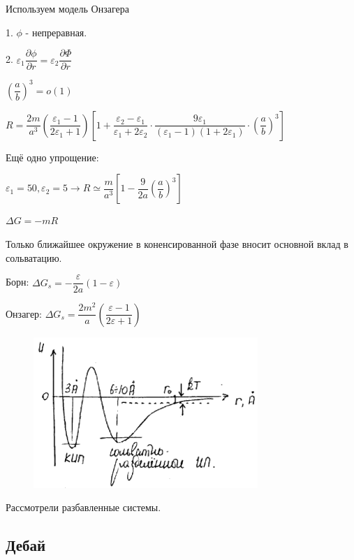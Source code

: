 \begin{lecture}
\begin{lecSection}
\par Используем модель Онзагера
\par 1. $\phi$ - непреравная.
\par 2. $\varepsilon_1 \dfrac{\partial \phi}{\partial r} = \varepsilon_2 \dfrac{\partial \Phi}{\partial r}$
\par $\left(\dfrac{a}{b}\right)^3 = o(1)$
\par $R = \dfrac{2m}{a^3} \left(\dfrac{\varepsilon_1-1}{2 \varepsilon_1 + 1}\right) \left[1 + \dfrac{\varepsilon_2 - \varepsilon_1}{\varepsilon_1 + 2 \varepsilon_2} \cdot \dfrac{9 \varepsilon_1}{(\varepsilon_1 - 1)(1 + 2 \varepsilon_1)} \cdot \left( \dfrac{a}{b}\right)^3 \right]$
\par Ещё одно упрощение:
\par $\varepsilon_1 = 50, \varepsilon_2 = 5 \rightarrow R \simeq \dfrac{m}{a^3} \left[1 - \dfrac{9}{2a} \left(\dfrac{a}{b}\right)^3\right]$
\par $\Delta G = -mR$
\par Только ближайшее окружение в коненсированной фазе вносит основной вклад в сольватацию.

\par Борн: $\Delta G_s = - \dfrac{\varepsilon}{2a}(1-\varepsilon)$
\par Онзагер: $\Delta G_s = \dfrac{2m^2}{a} \left(
\dfrac{\varepsilon - 1}{2 \varepsilon + 1}\right)$

	
\begin{figure}[H]
	
	\centering\includegraphics[width=0.6\linewidth]{lecture_09/new_pic7}
	
	\end{figure}
	
	\par Рассмотрели разбавленные системы.
	
\subsection{Дебай}


\end{lecSection}
\end{lecture}
